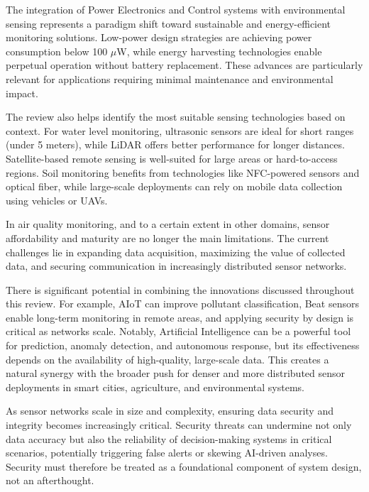 \documentclass[conference]{IEEEtran}
\begin{document}
The integration of Power Electronics and Control systems with environmental sensing represents a paradigm shift toward sustainable and energy-efficient monitoring solutions. Low-power design strategies are achieving power consumption below 100 $\mu$W, while energy harvesting technologies enable perpetual operation without battery replacement. These advances are particularly relevant for applications requiring minimal maintenance and environmental impact.

The review also helps identify the most suitable sensing technologies based on context. For water level monitoring, ultrasonic sensors are ideal for short ranges (under 5 meters), while LiDAR offers better performance for longer distances. Satellite-based remote sensing is well-suited for large areas or hard-to-access regions. Soil monitoring benefits from technologies like NFC-powered sensors and optical fiber, while large-scale deployments can rely on mobile data collection using vehicles or UAVs.

In air quality monitoring, and to a certain extent in other domains, sensor affordability and maturity are no longer the main limitations. The current challenges lie in expanding data acquisition, maximizing the value of collected data, and securing communication in increasingly distributed sensor networks.

There is significant potential in combining the innovations discussed throughout this review. For example, AIoT can improve pollutant classification, Beat sensors enable long-term monitoring in remote areas, and applying security by design is critical as networks scale. Notably, Artificial Intelligence can be a powerful tool for prediction, anomaly detection, and autonomous response, but its effectiveness depends on the availability of high-quality, large-scale data. This creates a natural synergy with the broader push for denser and more distributed sensor deployments in smart cities, agriculture, and environmental systems.

As sensor networks scale in size and complexity, ensuring data security and integrity becomes increasingly critical. Security threats can undermine not only data accuracy but also the reliability of decision-making systems in critical scenarios, potentially triggering false alerts or skewing AI-driven analyses. Security must therefore be treated as a foundational component of system design, not an afterthought.

\end{document}
